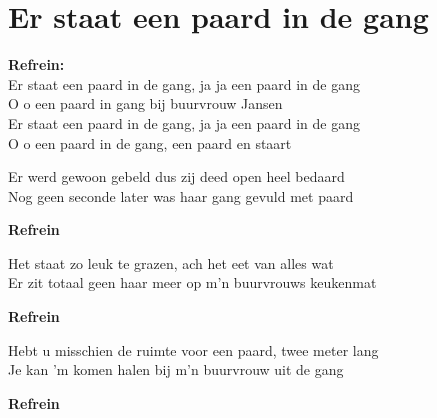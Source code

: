 \section{Er staat een paard in de gang}
\textbf{Refrein:}\\
Er staat een paard in de gang, ja ja een paard in de gang\\
O o een paard in gang bij buurvrouw Jansen\\
Er staat een paard in de gang, ja ja een paard in de gang\\
O o een paard in de gang, een paard en staart

Er werd gewoon gebeld dus zij deed open heel bedaard\\
Nog geen seconde later was haar gang gevuld met paard

\textbf{Refrein}

Het staat zo leuk te grazen, ach het eet van alles wat\\
Er zit totaal geen haar meer op m'n buurvrouws keukenmat

\textbf{Refrein}

Hebt u misschien de ruimte voor een paard, twee meter lang\\
Je kan 'm komen halen bij m'n buurvrouw uit de gang

\textbf{Refrein}
